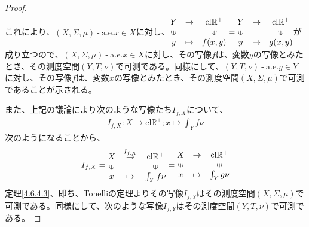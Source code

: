 \documentclass[dvipdfmx]{jsarticle}
\begin{document}
\begin{proof}
\begin{align*}
\end{align*}
これにより、$(X,\varSigma,\mu) \ \text{-} \ \mathrm{a.e.}x \in X$に対し、$\begin{matrix}
Y & \rightarrow & \mathrm{cl}\mathbb{R}^{+} \\
\text{\rotatebox[origin=c]{90}{$\in$}} & & \text{\rotatebox[origin=c]{90}{$\in$}} \\
y & \mapsto & f(x,y) \\
\end{matrix} = \begin{matrix}
Y & \rightarrow & \mathrm{cl}\mathbb{R}^{+} \\
\text{\rotatebox[origin=c]{90}{$\in$}} & & \text{\rotatebox[origin=c]{90}{$\in$}} \\
y & \mapsto & g(x,y) \\
\end{matrix}$が成り立つので、$(X,\varSigma,\mu) \ \text{-} \ \mathrm{a.e.}x \in X$に対し、その写像$f$は、変数$y$の写像とみたとき、その測度空間$(Y,T,\nu)$で可測である。同様にして、$(Y,T,\nu) \ \text{-} \ \mathrm{a.e.}y \in Y$に対し、その写像$f$は、変数$x$の写像とみたとき、その測度空間$(X,\varSigma,\mu)$で可測であることが示される。\par
また、上記の議論により次のような写像たち$I_{f,X}$について、
\begin{align*}
I_{f,X}:X \rightarrow \mathrm{cl}\mathbb{R}^{+};x \mapsto \int_{Y} {f\nu}
\end{align*}
次のようになることから、
\begin{align*}
I_{f,X} = \begin{matrix}
X & \overset{I_{f,X}}{\rightarrow} & \mathrm{cl}\mathbb{R}^{+} \\
\text{\rotatebox[origin=c]{90}{$\in$}} & & \text{\rotatebox[origin=c]{90}{$\in$}} \\
x & \mapsto & \int_{Y} {f\nu} \\
\end{matrix} = \begin{matrix}
X & \rightarrow & \mathrm{cl}\mathbb{R}^{+} \\
\text{\rotatebox[origin=c]{90}{$\in$}} & & \text{\rotatebox[origin=c]{90}{$\in$}} \\
x & \mapsto & \int_{Y} {g\nu} \\
\end{matrix}
\end{align*}
定理\ref{4.6.4.3}、即ち、Tonelliの定理よりその写像$I_{f,Y}$はその測度空間$(X,\varSigma,\mu)$で可測である。同様にして、次のような写像$I_{f,Y}$はその測度空間$(Y,T,\nu)$で可測である。

\end{proof}
\end{document}
